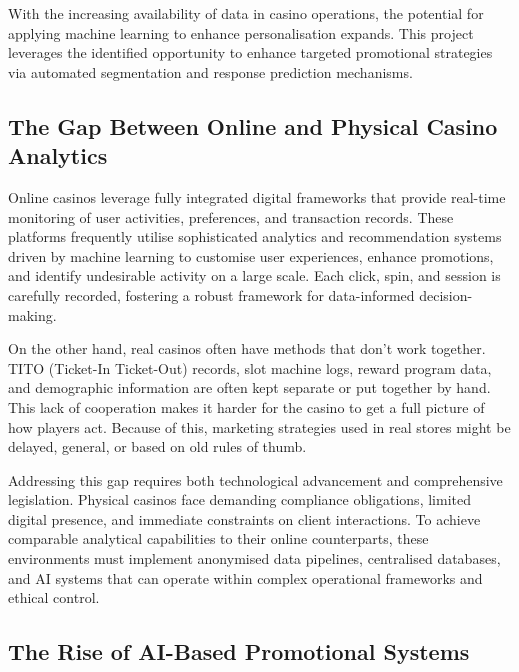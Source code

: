 \documentclass[12pt,a4paper]{report}
\begin{document}
 With the increasing availability of data in casino operations, the potential for applying machine learning to enhance personalisation expands.  This project leverages the identified opportunity to enhance targeted promotional strategies via automated segmentation and response prediction mechanisms.


\subsection{The Gap Between Online and Physical Casino Analytics}

Online casinos leverage fully integrated digital frameworks that provide real-time monitoring of user activities, preferences, and transaction records.  These platforms frequently utilise sophisticated analytics and recommendation systems driven by machine learning to customise user experiences, enhance promotions, and identify undesirable activity on a large scale.  Each click, spin, and session is carefully recorded, fostering a robust framework for data-informed decision-making.

On the other hand, real casinos often have methods that don't work together.   TITO (Ticket-In Ticket-Out) records, slot machine logs, reward program data, and demographic information are often kept separate or put together by hand.   This lack of cooperation makes it harder for the casino to get a full picture of how players act.   Because of this, marketing strategies used in real stores might be delayed, general, or based on old rules of thumb.

Addressing this gap requires both technological advancement and comprehensive legislation.   Physical casinos face demanding compliance obligations, limited digital presence, and immediate constraints on client interactions.   To achieve comparable analytical capabilities to their online counterparts, these environments must implement anonymised data pipelines, centralised databases, and AI systems that can operate within complex operational frameworks and ethical control.

\subsection{The Rise of AI-Based Promotional Systems}

\end{document}
